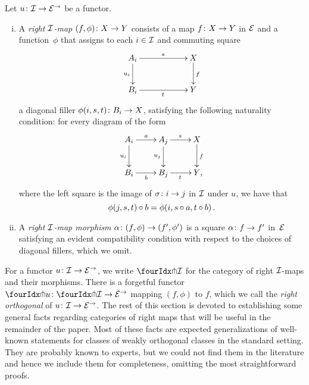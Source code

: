 \documentclass[reqno,10pt,a4paper,oneside,draft]{amsart}
\begin{document}
\begin{definition} \label{def:right-map}
Let $u \co \cal{I} \to \catE^\to$ be a functor.
\begin{enumerate}[(i)]
\item A \emph{right $\cal{I}$-map} $(f, \phi) \co X \to Y$ consists of a map $f \co X \to Y$ in $\catE$ and a
 function~$\phi$ that assigns to each $i \in \cal{I}$ and commuting square
\[
\xymatrix@C=2cm{
  A_i
  \ar[r]^{s}
  \ar[d]_{u_i}
&
  X
  \ar[d]^f
\\
  B_i
  \ar[r]_{t}
&
  Y
}
\]
a diagonal filler $\phi(i,s, t) \co B_i \to X$, satisfying the following naturality condition: for every diagram of the form
\[
\xymatrix{
  A_i
  \ar[r]^{a}
  \ar[d]_{u_i}
&
  A_j
  \ar[r]^{s}
  \ar[d]_{u_j}
&
  X
  \ar[d]^f
\\
  B_i
  \ar[r]_{b}
&
  B_j
  \ar[r]_{t}
&
  Y
\rlap{,}}
\]
where the left square is the image of $\sigma \co i \to j$ in $\cal{I}$ under $u$, we have that
\[
  \phi(j, s, t) \cc b = \phi(i, s \cc a, t \cc b) \, .
\]
\item A \emph{right $\cal{I}$-map morphism} $\alpha \co (f, \phi) \to (f', \phi')$ is a square $\alpha \co f \to f'$ in~$\catE$ satisfying an evident compatibility condition with respect to the choices of diagonal fillers, which we omit.
\end{enumerate}
\end{definition}




For a functor $u \co \cal{I} \to \catE^\to$, we write $\liftr{\cal{I}}$ for the category of right $\cal{I}$-maps and their morphisms.
There is a forgetful functor~$\liftr{u} \co \liftr{\cal{I}} \to \catE^\to$ mapping $(f, \phi)$ to $f$, which we 
call   the \emph{right orthogonal} of $u \co \cal{I} \to \catE^\to$. The rest of this section is devoted to establishing some general facts regarding categories of right maps that will be useful in the remainder of the paper.
Most of these facts are expected generalizations of well-known statements for classes of weakly orthogonal classes in the standard setting.
They are probably known to experts, but we could not find them in the literature and hence we include them for completeness, omitting the most straightforward proofs.
\end{document}
